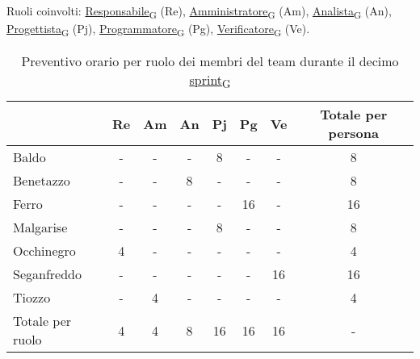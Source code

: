 \newpage
{}
Ruoli coinvolti: \href{https://7last.github.io/docs/pb/documentazione-interna/glossario\#responsabile}{Responsabile\textsubscript{G}} (Re), \href{https://7last.github.io/docs/pb/documentazione-interna/glossario\#amministratore}{Amministratore\textsubscript{G}} (Am), \href{https://7last.github.io/docs/pb/documentazione-interna/glossario\#analista}{Analista\textsubscript{G}} (An), \href{https://7last.github.io/docs/pb/documentazione-interna/glossario\#progettista}{Progettista\textsubscript{G}} (Pj), \href{https://7last.github.io/docs/pb/documentazione-interna/glossario\#programmatore}{Programmatore\textsubscript{G}} (Pg), \href{https://7last.github.io/docs/pb/documentazione-interna/glossario\#verificatore}{Verificatore\textsubscript{G}} (Ve).
\begin{table}[!h]
    \centering
    \begin{tabular}{ | l | c | c | c | c | c | c | c | }
        \hline
        \textbf{} & \textbf{Re} & \textbf{Am} &\textbf{An} & \textbf{Pj} & \textbf{Pg} & \textbf{Ve} & \textbf{Totale per persona} \\
        \hline
        Baldo            &  -   &  -   &  -   &  8   &  -   &  -   &  8   \\
        Benetazzo        &  -   &  -   &  8   &  -   &  -   &  -   &  8   \\
        Ferro            &  -   &  -   &  -   &  -   & 16   &  -   & 16   \\
        Malgarise        &  -   &  -   &  -   &  8   &  -   &  -   &  8   \\
        Occhinegro       &  4   &  -   &  -   &  -   &  -   &  -   &  4   \\
        Seganfreddo      &  -   &  -   &  -   &  -   &  -   & 16   & 16   \\
        Tiozzo           &  -   &  4   &  -   &  -   &  -   &  -   &  4   \\
        \hline
        Totale per ruolo &  4   &  4   &  8   & 16   & 16   & 16   &  -   \\
        \hline
    \end{tabular}
    \caption{Preventivo orario per ruolo dei membri del team durante il decimo \href{https://7last.github.io/docs/pb/documentazione-interna/glossario\#sprint}{sprint\textsubscript{G}}}
    
\end{table}

